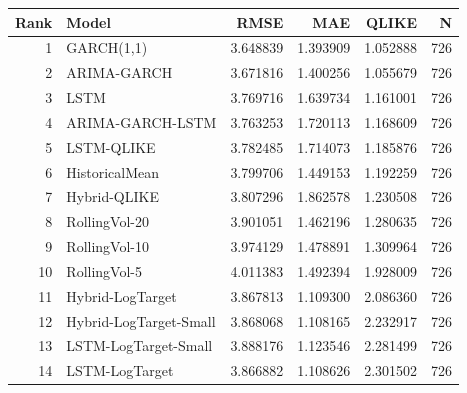 \begin{tabular}{r l r r r r}
\hline
Rank & Model & RMSE & MAE & QLIKE & N \\
\hline
1 & GARCH(1,1) & 3.648839 & 1.393909 & 1.052888 & 726 \\
2 & ARIMA-GARCH & 3.671816 & 1.400256 & 1.055679 & 726 \\
3 & LSTM & 3.769716 & 1.639734 & 1.161001 & 726 \\
4 & ARIMA-GARCH-LSTM & 3.763253 & 1.720113 & 1.168609 & 726 \\
5 & LSTM-QLIKE & 3.782485 & 1.714073 & 1.185876 & 726 \\
6 & HistoricalMean & 3.799706 & 1.449153 & 1.192259 & 726 \\
7 & Hybrid-QLIKE & 3.807296 & 1.862578 & 1.230508 & 726 \\
8 & RollingVol-20 & 3.901051 & 1.462196 & 1.280635 & 726 \\
9 & RollingVol-10 & 3.974129 & 1.478891 & 1.309964 & 726 \\
10 & RollingVol-5 & 4.011383 & 1.492394 & 1.928009 & 726 \\
11 & Hybrid-LogTarget & 3.867813 & 1.109300 & 2.086360 & 726 \\
12 & Hybrid-LogTarget-Small & 3.868068 & 1.108165 & 2.232917 & 726 \\
13 & LSTM-LogTarget-Small & 3.888176 & 1.123546 & 2.281499 & 726 \\
14 & LSTM-LogTarget & 3.866882 & 1.108626 & 2.301502 & 726 \\
\hline
\end{tabular}
